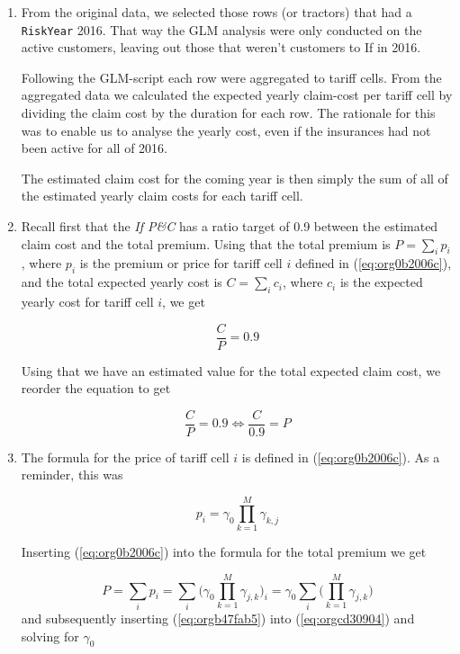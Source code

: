 \documentclass[11pt]{article}
\begin{document}
\begin{enumerate}
\item From the original data, we selected those rows (or tractors) that had a \texttt{RiskYear} 2016. That 
way the GLM analysis were only conducted on the active customers, leaving out those that weren't 
customers to If in 2016. 

Following the GLM-script each row were aggregated to tariff cells.
From the aggregated data we calculated the expected yearly claim-cost per tariff cell by dividing the
claim cost by the duration for each row. The rationale for this was to enable us to analyse the 
yearly cost, even if the insurances had not been active for all of 2016. 

The estimated claim cost for the coming year is then simply the sum of all of the estimated yearly 
claim costs for each tariff cell.

\item Recall first that the \emph{If P\&C} has a ratio target of 0.9 between the estimated claim cost and the total premium.
Using that the total premium is \(P = \sum_i p_i\), where \(p_i\) is the premium or price for tariff cell \(i\) defined 
in (\ref{eq:org0b2006c}), and the total expected yearly cost is \(C = \sum_i c_i\), where \(c_i\) is the expected yearly cost 
for tariff cell \(i\), we get

\begin{equation}
\label{eq:org8ea1b81}
  \frac{C}{P} = 0.9 
\end{equation}

Using that we have an estimated value for the total expected claim cost, we reorder the equation to get

\begin{equation}
\label{eq:orgcd30904}
\frac{C}{P} = 0.9 \iff \frac{C}{0.9} = P
\end{equation}

\item The formula for the price of tariff cell \(i\) is defined in (\ref{eq:org0b2006c}). As a reminder, this was

\[
      p_i = \gamma_0 \prod_{k = 1}^M \gamma_{k,j}
      \]

Inserting (\ref{eq:org0b2006c}) into the formula for the total premium we get

\begin{equation}
\label{eq:orgb47fab5}
P = \sum_i p_i = \sum_i \bigg (\gamma_0 \prod_{k = 1}^M \gamma_{j,k} \bigg)_i =  \gamma_0 \sum_i \bigg ( \prod_{k = 1}^M \gamma_{j,k} \bigg)
\end{equation}
and subsequently inserting (\ref{eq:orgb47fab5}) into (\ref{eq:orgcd30904}) and solving for \(\gamma_0\) 


\end{enumerate}
\end{document}
